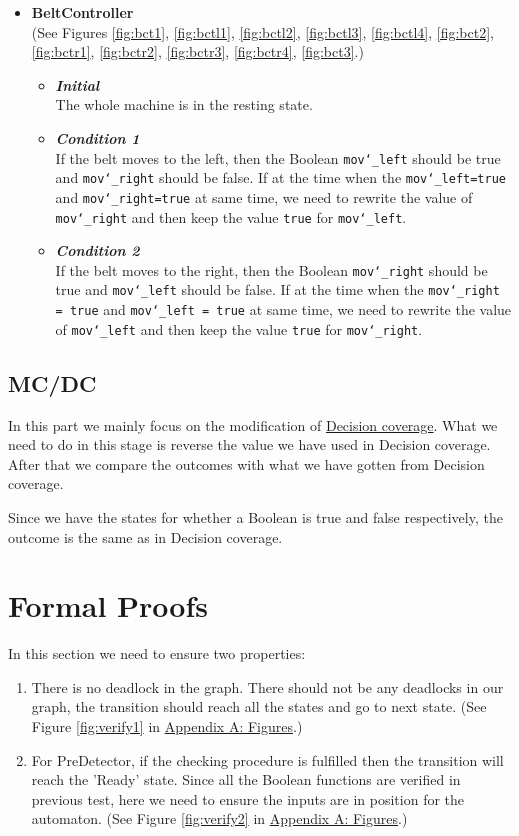 \documentclass[a4paper,oneside,11pt]{report}
\begin{document}
\begin{itemize}
\item \textbf{BeltController}\\
(See Figures \ref{fig:bct1}, \ref{fig:bctl1}, \ref{fig:bctl2}, \ref{fig:bctl3}, \ref{fig:bctl4}, \ref{fig:bct2}, \ref{fig:bctr1}, \ref{fig:bctr2}, \ref{fig:bctr3}, \ref{fig:bctr4}, \ref{fig:bct3}.)
\begin{itemize}
\item \textbf{\textit{Initial}}\\
The whole machine is in the resting state.
\item \textbf{\textit{Condition 1}}\\
If the belt moves to the left, then the Boolean \texttt{mov\char`_left} should be true and \texttt{mov\char`_right} should be false. If at the time when the \texttt{mov\char`_left=true} and \texttt{mov\char`_right=true} at same time, we need to rewrite the value of \texttt{mov\char`_right} and then keep the value \texttt{true} for \texttt{mov\char`_left}.
\item \textbf{\textit{Condition 2}}\\
If the belt moves to the right, then the Boolean \texttt{mov\char`_right} should be true and \texttt{mov\char`_left} should be false. If at the time when the \texttt{mov\char`_right = true} and \texttt{mov\char`_left = true} at same time, we need to rewrite the value of \texttt{mov\char`_left} and then keep the value \texttt{true} for \texttt{mov\char`_right}.
\end{itemize}
\end{itemize}

\subsection{MC/DC}
In this part we mainly focus on the modification of \hyperref[sec:decicov]{Decision coverage}. What we need to do in this stage is reverse the value we have used in Decision coverage. After that we compare the outcomes with what we have gotten from Decision coverage.

Since we have the states for whether a Boolean is true and false respectively, the outcome is the same as in Decision coverage.

\section{Formal Proofs}
In this section we need to ensure two properties:
\begin{enumerate}
\item There is no deadlock in the graph. There should not be any deadlocks in our graph, the transition should reach all the states and go to next state. (See Figure \ref{fig:verify1} in \hyperref[sec:figures]{Appendix A: Figures}.)
\item For PreDetector, if the checking procedure is fulfilled then the transition will reach the 'Ready' state. Since all the Boolean functions are verified in previous test, here we need to ensure the inputs are in position for the automaton. (See Figure \ref{fig:verify2} in \hyperref[sec:figures]{Appendix A: Figures}.)
\end{enumerate}
\end{document}
